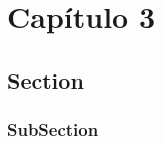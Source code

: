 \chapter{Capítulo 3}\label{cap:3}

\lipsum
\section{Section}
\lipsum
\subsection{SubSection}
\lipsum
